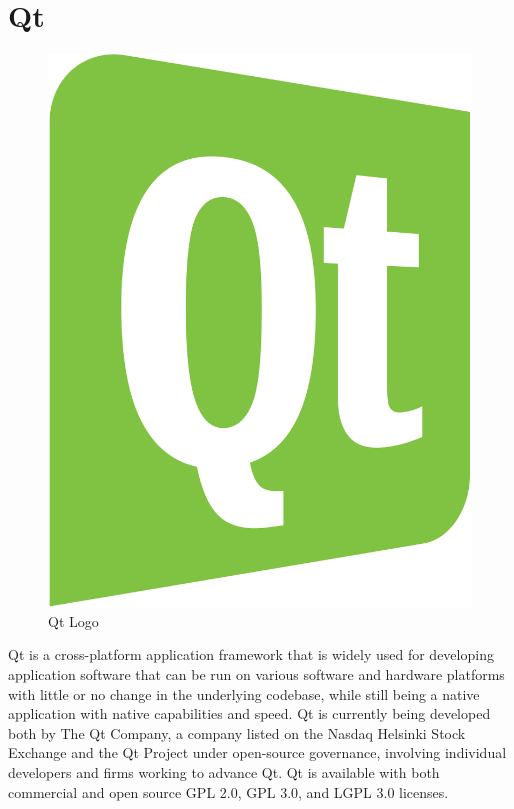 \section{Qt}

\begin{figure}[H]
	\centering \includegraphics[scale=0.1]{images/qt.png}
	\caption{Qt Logo}
\end{figure}

Qt is a cross-platform application framework that is widely used for developing application software that can be run on various software and hardware platforms with little or no change in the underlying codebase, while still being a native application with native capabilities and speed. Qt is currently being developed both by The Qt Company, a company listed on the Nasdaq Helsinki Stock Exchange and the Qt Project under open-source governance, involving individual developers and firms working to advance Qt. Qt is available with both commercial and open source GPL 2.0, GPL 3.0, and LGPL 3.0 licenses.


